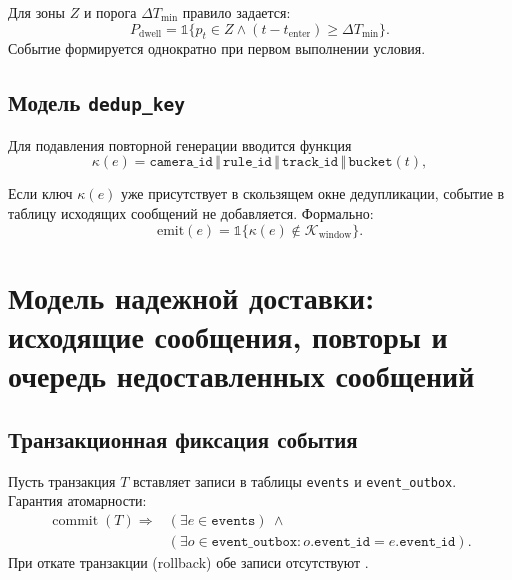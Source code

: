 Для зоны \(Z\) и порога \(\Delta T_{\min}\) правило задается:
\begin{equation}
P_{\text{dwell}} = \mathbb{1}\{p_t \in Z \land (t - t_{\text{enter}}) \ge \Delta T_{\min}\}.
\end{equation}
Событие формируется однократно при первом выполнении условия.

\subsection{Модель \texttt{dedup\_key}}

Для подавления повторной генерации вводится функция
\begin{equation}
\kappa(e) = \texttt{camera\_id} \,\Vert\, \texttt{rule\_id} \,\Vert\, \texttt{track\_id} \,\Vert\, \texttt{bucket}(t),
\end{equation}
\where
{}

Если ключ \(\kappa(e)\) уже присутствует в скользящем окне дедупликации, событие в таблицу исходящих сообщений не добавляется. Формально:
\begin{equation}
\text{emit}(e) = \mathbb{1}\{\kappa(e)\notin \mathcal{K}_{\text{window}}\}.
\end{equation}
\section{Модель надежной доставки: исходящие сообщения, повторы и очередь недоставленных сообщений}

\subsection{Транзакционная фиксация события}

Пусть транзакция \(T\) вставляет записи в таблицы \texttt{events} и \texttt{event\_outbox}. Гарантия атомарности:
\begin{equation}
\begin{aligned}
\operatorname{commit}(T) \Rightarrow {}&
(\exists e \in \texttt{events})\ \land \\
&(\exists o \in \texttt{event\_outbox}: o.\texttt{event\_id}=e.\texttt{event\_id}).
\end{aligned}
\end{equation}
При откате транзакции (rollback) обе записи отсутствуют \cite{transactional_outbox,richardson_microservices}.

